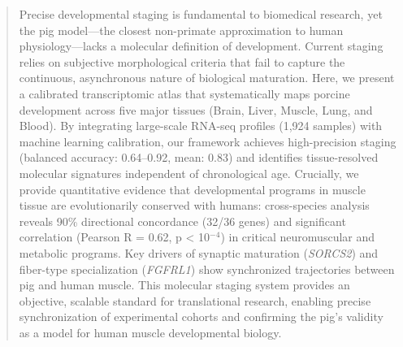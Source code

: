 \begin{abstract}
Precise developmental staging is fundamental to biomedical research, yet the pig model---the closest non-primate approximation to human physiology---lacks a molecular definition of development. Current staging relies on subjective morphological criteria that fail to capture the continuous, asynchronous nature of biological maturation. Here, we present a calibrated transcriptomic atlas that systematically maps porcine development across five major tissues (Brain, Liver, Muscle, Lung, and Blood). By integrating large-scale RNA-seq profiles (1,924 samples) with machine learning calibration, our framework achieves high-precision staging (balanced accuracy: 0.64--0.92, mean: 0.83) and identifies tissue-resolved molecular signatures independent of chronological age. Crucially, we provide quantitative evidence that developmental programs in muscle tissue are evolutionarily conserved with humans: cross-species analysis reveals 90\% directional concordance (32/36 genes) and significant correlation (Pearson R = 0.62, p < 10$^{-4}$) in critical neuromuscular and metabolic programs. Key drivers of synaptic maturation (\textit{SORCS2}) and fiber-type specialization (\textit{FGFRL1}) show synchronized trajectories between pig and human muscle. This molecular staging system provides an objective, scalable standard for translational research, enabling precise synchronization of experimental cohorts and confirming the pig's validity as a model for human muscle developmental biology.
\end{abstract}